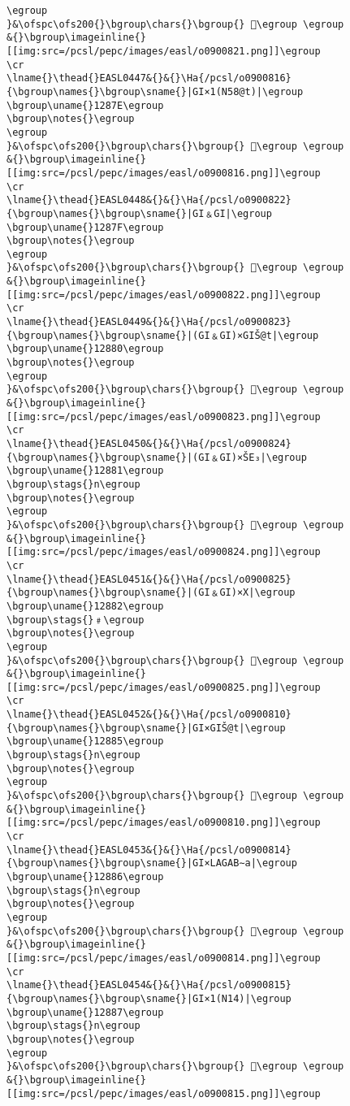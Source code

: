\begin{verbatim}
\egroup
}&\ofspc\ofs200{}\bgroup\chars{}\bgroup{} 𒡽\egroup \egroup
&{}\bgroup\imageinline{}[[img:src=/pcsl/pepc/images/easl/o0900821.png]]\egroup
\cr
\lname{}\thead{}EASL0447&{}&{}\Ha{/pcsl/o0900816}{\bgroup\names{}\bgroup\sname{}|GI×1(N58@t)|\egroup
\bgroup\uname{}1287E\egroup
\bgroup\notes{}\egroup
\egroup
}&\ofspc\ofs200{}\bgroup\chars{}\bgroup{} 𒡾\egroup \egroup
&{}\bgroup\imageinline{}[[img:src=/pcsl/pepc/images/easl/o0900816.png]]\egroup
\cr
\lname{}\thead{}EASL0448&{}&{}\Ha{/pcsl/o0900822}{\bgroup\names{}\bgroup\sname{}|GI﹠GI|\egroup
\bgroup\uname{}1287F\egroup
\bgroup\notes{}\egroup
\egroup
}&\ofspc\ofs200{}\bgroup\chars{}\bgroup{} 𒡿\egroup \egroup
&{}\bgroup\imageinline{}[[img:src=/pcsl/pepc/images/easl/o0900822.png]]\egroup
\cr
\lname{}\thead{}EASL0449&{}&{}\Ha{/pcsl/o0900823}{\bgroup\names{}\bgroup\sname{}|(GI﹠GI)×GIŠ@t|\egroup
\bgroup\uname{}12880\egroup
\bgroup\notes{}\egroup
\egroup
}&\ofspc\ofs200{}\bgroup\chars{}\bgroup{} 𒢀\egroup \egroup
&{}\bgroup\imageinline{}[[img:src=/pcsl/pepc/images/easl/o0900823.png]]\egroup
\cr
\lname{}\thead{}EASL0450&{}&{}\Ha{/pcsl/o0900824}{\bgroup\names{}\bgroup\sname{}|(GI﹠GI)×ŠE₃|\egroup
\bgroup\uname{}12881\egroup
\bgroup\stags{}n\egroup
\bgroup\notes{}\egroup
\egroup
}&\ofspc\ofs200{}\bgroup\chars{}\bgroup{} 𒢁\egroup \egroup
&{}\bgroup\imageinline{}[[img:src=/pcsl/pepc/images/easl/o0900824.png]]\egroup
\cr
\lname{}\thead{}EASL0451&{}&{}\Ha{/pcsl/o0900825}{\bgroup\names{}\bgroup\sname{}|(GI﹠GI)×X|\egroup
\bgroup\uname{}12882\egroup
\bgroup\stags{}﹟\egroup
\bgroup\notes{}\egroup
\egroup
}&\ofspc\ofs200{}\bgroup\chars{}\bgroup{} 𒢂\egroup \egroup
&{}\bgroup\imageinline{}[[img:src=/pcsl/pepc/images/easl/o0900825.png]]\egroup
\cr
\lname{}\thead{}EASL0452&{}&{}\Ha{/pcsl/o0900810}{\bgroup\names{}\bgroup\sname{}|GI×GIŠ@t|\egroup
\bgroup\uname{}12885\egroup
\bgroup\stags{}n\egroup
\bgroup\notes{}\egroup
\egroup
}&\ofspc\ofs200{}\bgroup\chars{}\bgroup{} 𒢅\egroup \egroup
&{}\bgroup\imageinline{}[[img:src=/pcsl/pepc/images/easl/o0900810.png]]\egroup
\cr
\lname{}\thead{}EASL0453&{}&{}\Ha{/pcsl/o0900814}{\bgroup\names{}\bgroup\sname{}|GI×LAGAB∼a|\egroup
\bgroup\uname{}12886\egroup
\bgroup\stags{}n\egroup
\bgroup\notes{}\egroup
\egroup
}&\ofspc\ofs200{}\bgroup\chars{}\bgroup{} 𒢆\egroup \egroup
&{}\bgroup\imageinline{}[[img:src=/pcsl/pepc/images/easl/o0900814.png]]\egroup
\cr
\lname{}\thead{}EASL0454&{}&{}\Ha{/pcsl/o0900815}{\bgroup\names{}\bgroup\sname{}|GI×1(N14)|\egroup
\bgroup\uname{}12887\egroup
\bgroup\stags{}n\egroup
\bgroup\notes{}\egroup
\egroup
}&\ofspc\ofs200{}\bgroup\chars{}\bgroup{} 𒢇\egroup \egroup
&{}\bgroup\imageinline{}[[img:src=/pcsl/pepc/images/easl/o0900815.png]]\egroup

\end{verbatim}

